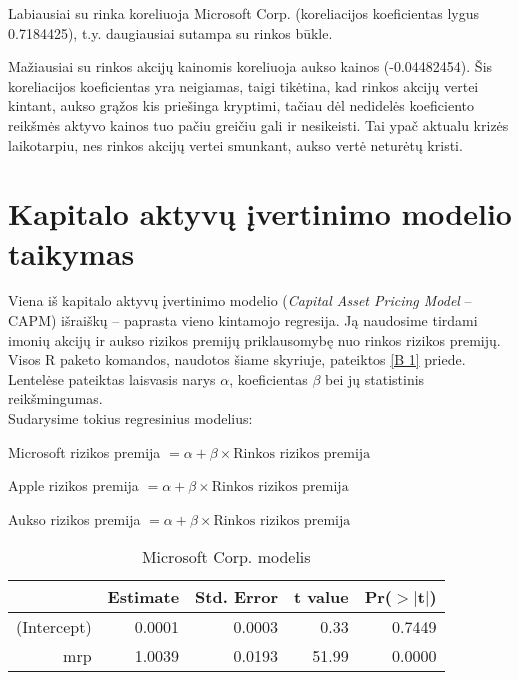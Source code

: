 \documentclass[12pt, a14paper, lithuanian]{article}
\begin{document}
Labiausiai su rinka koreliuoja Microsoft Corp. (koreliacijos koeficientas lygus 0.7184425), t.y. daugiausiai sutampa su rinkos būkle.

Mažiausiai su rinkos akcijų kainomis koreliuoja aukso kainos (-0.04482454). Šis koreliacijos koeficientas yra neigiamas, taigi tikėtina, kad rinkos akcijų vertei kintant, aukso grąžos kis priešinga kryptimi, tačiau dėl nedidelės koeficiento reikšmės aktyvo kainos tuo pačiu greičiu gali ir nesikeisti. Tai ypač aktualu krizės laikotarpiu, nes rinkos akcijų vertei smunkant, aukso vertė neturėtų kristi.



\newpage
\section{Kapitalo aktyvų įvertinimo modelio taikymas}

Viena iš kapitalo aktyvų įvertinimo modelio (\textit{Capital Asset Pricing Model} -- CAPM) išraiškų -- paprasta vieno kintamojo regresija. Ją naudosime tirdami imonių akcijų ir aukso rizikos premijų priklausomybę nuo rinkos rizikos premijų. Visos R paketo komandos, naudotos šiame skyriuje, pateiktos \ref{B 1} priede.
Lentelėse pateiktas laisvasis narys $ \alpha $, koeficientas  $ \beta $ bei jų statistinis reikšmingumas.\\

Sudarysime tokius regresinius modelius:

Microsoft rizikos premija $= \alpha + \beta \times  \text {Rinkos rizikos premija}$

Apple rizikos premija $= \alpha + \beta \times  \text {Rinkos rizikos premija}$

Aukso rizikos premija $= \alpha + \beta \times \text {Rinkos rizikos premija}$



\begin{table}[ht]
\begin{center}
\begin{tabular}{rrrrr}
  \hline
 & Estimate & Std. Error & t value & Pr($>$$|$t$|$) \\ 
  \hline
(Intercept) & 0.0001 & 0.0003 & 0.33 & 0.7449 \\ 
  mrp & 1.0039 & 0.0193 & 51.99 & 0.0000 \\ 
   \hline
\end{tabular}
\end{center}
\caption{Microsoft Corp. modelis}
\end{table}
\end{document}
